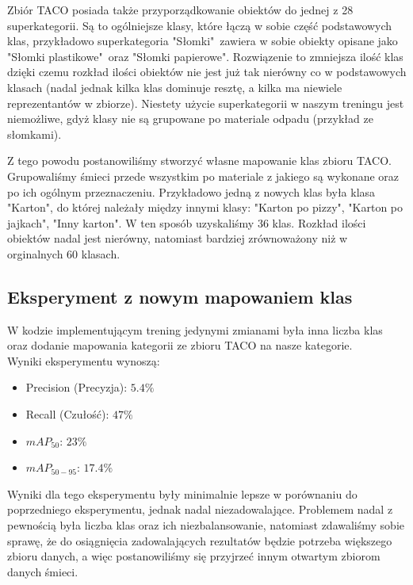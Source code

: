 \documentclass[licencjacka]{pracamgr}
\begin{document}
Zbiór TACO posiada także przyporządkowanie obiektów do jednej z 28 superkategorii. Są to ogólniejsze klasy, które łączą w sobie część podstawowych klas, przykładowo superkategoria "Słomki"\ zawiera w sobie obiekty opisane jako "Słomki plastikowe"\ oraz "Słomki papierowe". Rozwiązenie to zmniejsza ilość klas dzięki czemu rozkład ilości obiektów nie jest już tak nierówny co w podstawowych klasach (nadal jednak kilka klas dominuje resztę, a kilka ma niewiele reprezentantów w zbiorze). Niestety użycie superkategorii w naszym treningu jest niemożliwe, gdyż klasy nie są grupowane po materiale odpadu (przykład ze słomkami). 


Z tego powodu postanowiliśmy stworzyć własne mapowanie klas zbioru TACO. Grupowaliśmy śmieci przede wszystkim po materiale z jakiego są wykonane oraz po ich ogólnym przeznaczeniu. Przykładowo jedną z nowych klas była klasa "Karton", do której należały między innymi klasy: "Karton po pizzy", "Karton po jajkach", "Inny karton". W ten sposób uzyskaliśmy 36 klas. Rozkład ilości obiektów nadal jest nierówny, natomiast bardziej zrównoważony niż w orginalnych 60 klasach.

\subsection{Eksperyment z nowym mapowaniem klas}

W kodzie implementującym trening jedynymi zmianami była inna liczba klas oraz dodanie mapowania kategorii ze zbioru TACO na nasze kategorie.
\\

Wyniki eksperymentu wynoszą:

\begin{itemize}
    \item Precision (Precyzja): $5.4\%$
    \item Recall (Czułość): $47\%$
    \item $mAP_{50}$: $23\%$
    \item $mAP_{50-95}$: $17.4\%$
\end{itemize}

Wyniki dla tego eksperymentu były minimalnie lepsze w porównaniu do poprzedniego eksperymentu, jednak nadal niezadowalające. Problemem nadal z pewnością była liczba klas oraz ich niezbalansowanie, natomiast zdawaliśmy sobie sprawę, że do osiągnięcia zadowalających rezultatów będzie potrzeba większego zbioru danych, a więc postanowiliśmy się przyjrzeć innym otwartym zbiorom danych śmieci.
\end{document}
